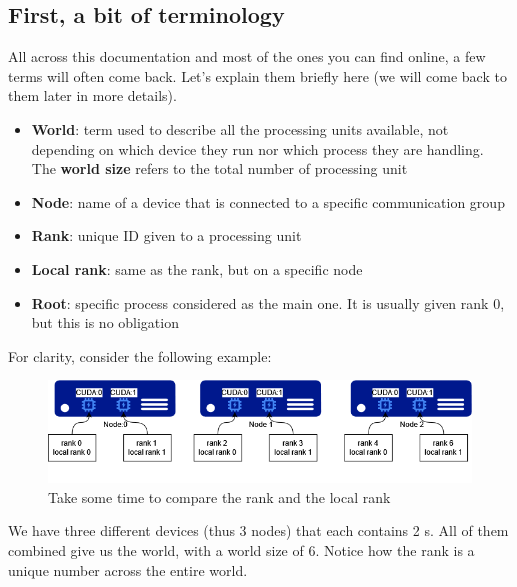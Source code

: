 \documentclass{article}
\begin{document}
\subsection{First, a bit of terminology}
All across this documentation and most of the ones you can find online, a few terms will often come back. Let's explain them briefly here (we will come back to them later in more details).

\begin{itemize}
  \item \textbf{World}: term used to describe all the processing units available, not depending on which device they run nor which process they are handling. The \textbf{world size} refers to the total number of processing unit
  \item \textbf{Node}: name of a device that is connected to a specific communication group
  \item \textbf{Rank}: unique ID given to a processing unit
  \item \textbf{Local rank}: same as the rank, but on a specific node
  \item \textbf{Root}: specific process considered as the main one. It is usually given rank 0, but this is no obligation
\end{itemize}
For clarity, consider the following example:
\begin{figure}[h!]
  \center
  \includegraphics[width=0.7\linewidth]{images/2022-08-24-17-37-31.png}
  \caption{Take some time to compare the rank and the local rank}
\end{figure}
\FloatBarrier

We have three different devices (thus 3 nodes) that each contains 2 s. All of them combined give us the world, with a world size of 6. Notice how the rank is a unique number across the entire world.
\end{document}
